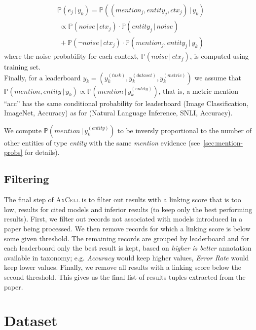 \documentclass[11pt,a4paper]{article}
\newcommand{\PrOP}{\mathbb{P}}
\newcommand{\model}{\textsc{AxCell}}
\newcommand{\prCond}[2]{\PrOP\left(#1\,|\,#2\right)}
\begin{document}
\begin{align*}
  &\prCond{e_j}{y_k} = \prCond{(\textit{mention}_j, \textit{entity}_j, \textit{ctx}_j)}{y_k}\\ &\;\propto\prCond{\textit{noise}}{\textit{ctx}_j}\cdot\prCond{\textit{entity}_j}{\textit{noise}}\\
  &\;+\prCond{\neg\textit{noise}}{\textit{ctx}_j}\cdot\prCond{\textit{mention}_j, \textit{entity}_j}{y_k}
\end{align*}
where the noise probability for each context, $\prCond{\textit{noise}}{\textit{ctx}_j}$, is computed using training set. \\

Finally, for a leaderboard $y_k=(y_k^{(\textit{task})}, y_k^{(\textit{dataset})}, y_k^{(\textit{metric})})$ we assume that $\prCond{\textit{mention}, \textit{entity}}{y_k} \!\propto\! \prCond{\textit{mention}}{y_k^{(\textit{entity})}}$, that is, a metric mention ``acc'' has the same conditional probability for leaderboard (Image Classification, ImageNet, Accuracy) as for (Natural Language Inference, SNLI, Accuracy).


We compute $\prCond{\textit{mention}}{y_k^{(\textit{entity})}}$ to be inversly proportional to the number of other entities of type \textit{entity} with the same \textit{mention} evidence (see~\cref{sec:mention-probs} for details).


\subsection{Filtering}
The final step of \model{} is to filter out results with a linking score that is too low, results for cited models and inferior results (to keep only the best performing results). First, we filter out records not associated with models introduced in a paper being processed. We then remove records for which a linking score is below some given threshold. The remaining records are grouped by leaderboard and for each leaderboard only the best result is kept, based on \textit{higher is better} annotation available in taxonomy; e.g. \textit{Accuracy} would keep higher values, \textit{Error Rate} would keep lower values. Finally, we remove all results with a linking score below the second threshold. This gives us the final list of results tuples extracted from the paper.
 

\section{Dataset}
\label{sec:dataset}
\end{document}

